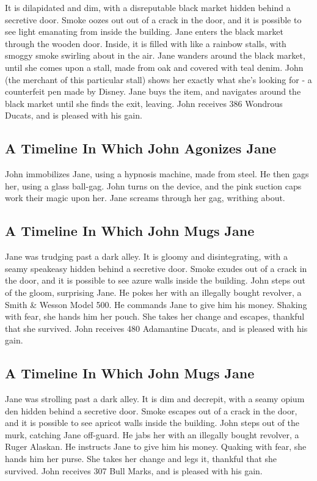 \documentclass{article}
\begin{document}
It is dilapidated and dim, with a disreputable black market hidden behind a secretive door.
Smoke oozes out out of a crack in the door, and it is possible to see light emanating from inside the building.
Jane enters the black market through the wooden door.
Inside, it is filled with like a rainbow stalls, with smoggy smoke swirling about in the air.
Jane wanders around the black market, until she comes upon a stall, made from oak and covered with teal denim.
John (the merchant of this particular stall) shows her exactly what she's looking for {-} a counterfeit pen made by Disney.
Jane buys the item, and navigates around the black market until she finds the exit, leaving.
John receives 386 Wondrous Ducats, and is pleased with his gain.
\subsection{A Timeline In Which John Agonizes Jane}


John immobilizes Jane, using a hypnosis machine, made from steel.
He then gags her, using a glass ball{-}gag.
John turns on the device, and the pink suction caps work their magic upon her.
Jane screams through her gag, writhing about.
\subsection{A Timeline In Which John Mugs Jane}


Jane was trudging past a dark alley.
It is gloomy and disintegrating, with a seamy speakeasy hidden behind a secretive door.
Smoke exudes out of a crack in the door, and it is possible to see azure walls inside the building.
John steps out of the gloom, surprising Jane.
He pokes her with an illegally bought revolver, a Smith \& Wesson Model 500.
He commands Jane to give him his money.
Shaking with fear, she hands him her pouch.
She takes her change and escapes, thankful that she survived.
John receives 480 Adamantine Ducats, and is pleased with his gain.
\subsection{A Timeline In Which John Mugs Jane}


Jane was strolling past a dark alley.
It is dim and decrepit, with a seamy opium den hidden behind a secretive door.
Smoke escapes out of a crack in the door, and it is possible to see apricot walls inside the building.
John steps out of the murk, catching Jane off{-}guard.
He jabs her with an illegally bought revolver, a Ruger Alaskan.
He instructs Jane to give him his money.
Quaking with fear, she hands him her purse.
She takes her change and legs it, thankful that she survived.
John receives 307 Bull Marks, and is pleased with his gain.
\end{document}
